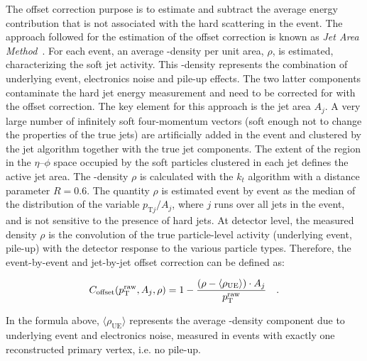 The offset correction purpose is to estimate and subtract the average energy contribution that is not associated with the hard scattering in the event. The approach followed for the estimation of the offset correction is known as \emph{Jet Area Method}~\cite{Cacciari:2007fd}. For each event, an average \pt-density per unit area, $\rho$, is estimated, characterizing the soft jet activity. This \pt-density represents the combination of underlying event, electronics noise and pile-up effects. 
The two latter components contaminate the hard jet energy measurement and need to be
corrected for with the offset correction. The key element for this approach is the jet area $A_j$.
A very large number of infinitely soft four-momentum vectors (soft enough not to change the properties of the true jets) are artificially added in the event and clustered by the jet algorithm together with the true jet components. The extent of the region in the $\eta$--$\phi$ space occupied by the soft particles clustered in each jet defines the active jet area. The \pt-density $\rho$ is calculated with the $k_t$ algorithm with a distance parameter $R=0.6$. The quantity $\rho$ is estimated event by event as the median of the distribution of the variable $p_{\mathrm{T}j}/A_j$, where $j$ runs over all jets in the event, and is not sensitive to the presence of hard jets. At detector level, the measured density $\rho$ is the convolution of the true particle-level activity (underlying event, pile-up) with the detector response to the various particle types. Therefore, the event-by-event and jet-by-jet offset correction can be defined as:

\begin{equation}
C_\mathrm{offset}(p_\mathrm{T}^\mathrm{raw},A_j,\rho) = 1 - \frac{\left( \rho - \langle\rho_\mathrm{UE}\rangle \right)\cdot A_j}{p_\mathrm{T}^\mathrm{raw}}\quad .
\end{equation}

\noindent In the formula above, $\langle\rho_\mathrm{UE}\rangle$ represents the average \pt-density component due to underlying event and electronics noise, measured in events with exactly one reconstructed primary vertex, i.e. no pile-up.


